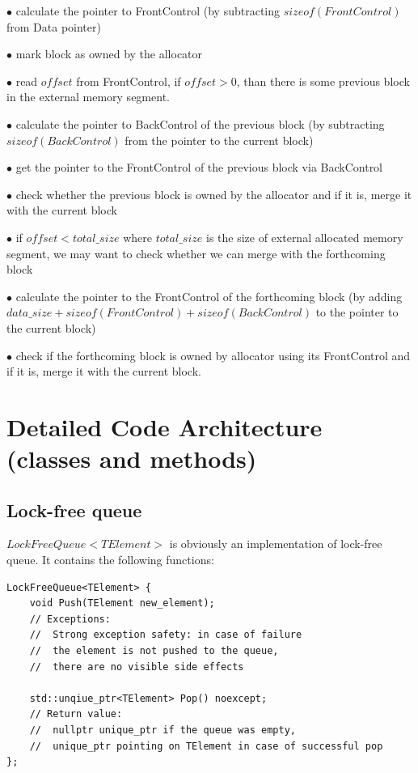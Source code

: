 \documentclass{article}
\begin{document}
$\bullet$ calculate the pointer to FrontControl (by subtracting $sizeof(FrontControl)$ from Data pointer)

$\bullet$ mark block as owned by the allocator

$\bullet$ read $offset$ from FrontControl, if $offset > 0$, than there is some previous block in the external memory segment.

$\bullet$ calculate the pointer to BackControl of the previous block (by subtracting $sizeof(BackControl)$ from the pointer to the current block)

$\bullet$ get the pointer to the FrontControl of the previous block via BackControl

$\bullet$ check whether the previous block is owned by the allocator and if it is, merge it with the current block

$\bullet$ if $offset < total\_size$ where $total\_size$ is the size of external allocated memory segment, we may want to check whether we can merge with the forthcoming block

$\bullet$ calculate the pointer to the FrontControl of the forthcoming block (by adding $data\_size + sizeof(FrontControl) + sizeof(BackControl)$ to the pointer to the current block)

$\bullet$ check if the forthcoming block is owned by allocator using its FrontControl and if it is, merge it with the current block.

\newpage

\section{Detailed Code Architecture (classes and methods)}

\subsection{Lock-free queue}

$LockFreeQueue<TElement>$ is obviously an implementation of lock-free queue. It contains the following functions:


\begin{lstlisting}
LockFreeQueue<TElement> {
	void Push(TElement new_element);
	// Exceptions:
	// 	Strong exception safety: in case of failure
	// 	the element is not pushed to the queue,
	// 	there are no visible side effects

	std::unqiue_ptr<TElement> Pop() noexcept;
	// Return value:
	// 	nullptr unique_ptr if the queue was empty,
	// 	unique_ptr pointing on TElement in case of successful pop
};
\end{lstlisting}
\end{document}
